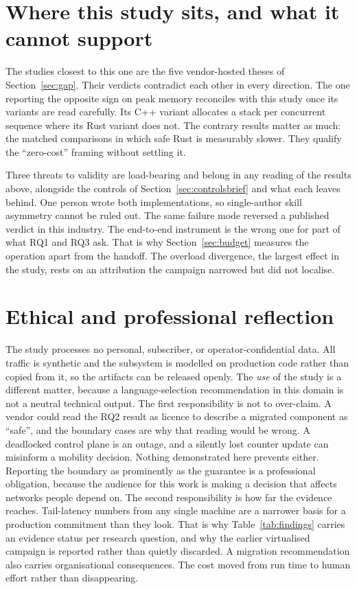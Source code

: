 \documentclass[english,oneside,a4paper,censored,csm,software-track-2020]{HYthesisML}
\begin{document}
\section{Where this study sits, and what it cannot support}\label{sec:standing}
The studies closest to this one are the five vendor-hosted theses of
Section~\ref{sec:gap}. Their verdicts contradict each other in every direction. The one
reporting the opposite sign on peak memory reconciles with this study once its variants are read
carefully. Its C++ variant allocates a stack per concurrent sequence where its Rust variant does not. The
contrary results matter as much: the matched comparisons in which safe Rust is measurably
slower. They qualify the ``zero-cost'' framing without settling it.

Three threats to validity are load-bearing and belong in any reading of the results above,
alongside the controls of Section~\ref{sec:controlsbrief} and what each leaves behind. One person
wrote both implementations, so single-author skill asymmetry cannot be ruled out. The same
failure mode reversed a published verdict in this industry. The end-to-end instrument is the
wrong one for part of what RQ1 and RQ3 ask. That is why Section~\ref{sec:budget} measures the
operation apart from the handoff. The overload divergence, the largest effect in the study, rests
on an attribution the campaign narrowed but did not localise.

\section{Ethical and professional reflection}
The study processes no personal, subscriber, or operator-confidential data. All traffic is
synthetic and the subsystem is modelled on production code rather than copied from it, so the
artifacts can be released openly. The \emph{use} of the study is a different matter, because a
language-selection recommendation in this domain is not a neutral technical output. The first
responsibility is not to over-claim. A vendor could read the RQ2 result as licence to describe a
migrated component as ``safe'', and the boundary cases are why that reading would be wrong. A deadlocked control plane is an outage, and a silently lost counter update can misinform a
mobility decision. Nothing demonstrated here prevents either. Reporting the boundary as prominently as
the guarantee is a professional obligation, because the audience for this work is making a
decision that affects networks people depend on. The second responsibility is how far the
evidence reaches. Tail-latency numbers from any single machine are a narrower basis for a
production commitment than they look. That is why Table~\ref{tab:findings} carries an evidence
status per research question, and why the earlier virtualised campaign is reported rather than
quietly discarded. A migration recommendation also carries organisational consequences. The cost
moved from run time to human effort rather than disappearing.
\end{document}
